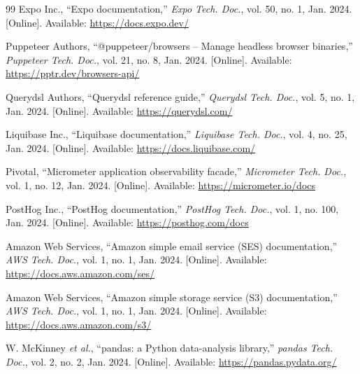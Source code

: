 \begin{thebibliography}{99}
Expo Inc., ``Expo documentation,'' \emph{Expo Tech. Doc.}, vol. 50, no. 1, Jan. 2024. [Online]. Available: \url{https://docs.expo.dev/}

Puppeteer Authors, ``@puppeteer/browsers -- Manage headless browser binaries,'' \emph{Puppeteer Tech. Doc.}, vol. 21, no. 8, Jan. 2024. [Online]. Available: \url{https://pptr.dev/browsers-api/}

Querydsl Authors, ``Querydsl reference guide,'' \emph{Querydsl Tech. Doc.}, vol. 5, no. 1, Jan. 2024. [Online]. Available: \url{https://querydsl.com/}

Liquibase Inc., ``Liquibase documentation,'' \emph{Liquibase Tech. Doc.}, vol. 4, no. 25, Jan. 2024. [Online]. Available: \url{https://docs.liquibase.com/}

Pivotal, ``Micrometer application observability facade,'' \emph{Micrometer Tech. Doc.}, vol. 1, no. 12, Jan. 2024. [Online]. Available: \url{https://micrometer.io/docs}

PostHog Inc., ``PostHog documentation,'' \emph{PostHog Tech. Doc.}, vol. 1, no. 100, Jan. 2024. [Online]. Available: \url{https://posthog.com/docs}

Amazon Web Services, ``Amazon simple email service (SES) documentation,'' \emph{AWS Tech. Doc.}, vol. 1, no. 1, Jan. 2024. [Online]. Available: \url{https://docs.aws.amazon.com/ses/}

Amazon Web Services, ``Amazon simple storage service (S3) documentation,'' \emph{AWS Tech. Doc.}, vol. 1, no. 1, Jan. 2024. [Online]. Available: \url{https://docs.aws.amazon.com/s3/}

W. McKinney \emph{et al.}, ``pandas: a Python data-analysis library,'' \emph{pandas Tech. Doc.}, vol. 2, no. 2, Jan. 2024. [Online]. Available: \url{https://pandas.pydata.org/}

\end{thebibliography}
